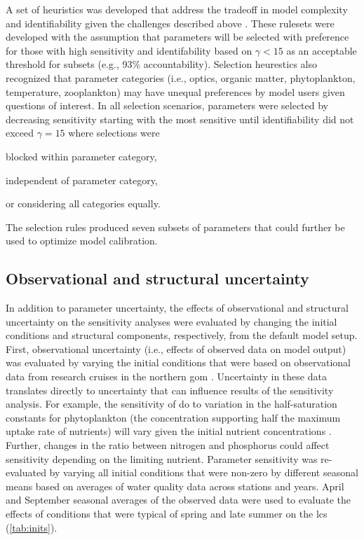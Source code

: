 \documentclass[letterpaper,12pt,oneside]{article}\usepackage[]{graphicx}\usepackage[]{color}
\begin{document}
A set of heuristics was developed that address the tradeoff in model complexity and identifiability given the challenges described above \citep[see also][]{Wagener01}.  These rulesets were developed with the assumption that parameters will be selected with preference for those with high sensitivity and identifability based on $\gamma < 15$ as an acceptable threshold for subsets (e.g., 93\% accountability).  Selection heurestics also recognized that parameter categories (i.e., optics, organic matter, phytoplankton, temperature, zooplankton) may have unequal preferences by model users given questions of interest.  In all selection scenarios, parameters were selected by decreasing sensitivity starting with the most sensitive until identifiability did not exceed $\gamma = 15$ where selections were \begin{inparaenum}[1\upshape)]
\item blocked within parameter category,
\item independent of parameter category,
\item or considering all categories equally.
\end{inparaenum} The selection rules produced seven subsets of parameters that could further be used to optimize model calibration.

\subsection{Observational and structural uncertainty}

In addition to parameter uncertainty, the effects of observational and structural uncertainty on the sensitivity analyses were evaluated by changing the initial conditions and structural components, respectively, from the default model setup.  First, observational uncertainty (i.e., effects of observed data on model output) was evaluated by varying the initial conditions that were based on observational data from research cruises in the northern \ac{gom} \citep{Murrell14}. Uncertainty in these data translates directly to uncertainty that can influence results of the sensitivity analysis.  For example, the sensitivity of \ac{do} to variation in the half-saturation constants for phytoplankton (the concentration supporting half the maximum uptake rate of nutrients) will vary given the initial nutrient concentrations \citep{Eppley69}.  Further, changes in the ratio between nitrogen and phosphorus could affect sensitivity depending on the limiting nutrient.  Parameter sensitivity was re-evaluated by varying all initial conditions that were non-zero by different seasonal means based on averages of water quality data across stations and years.  April and September seasonal averages of the observed data were used to evaluate the effects of conditions that were typical of spring and late summer on the \ac{lcs} (\cref{tab:inits}).  
\end{document}
